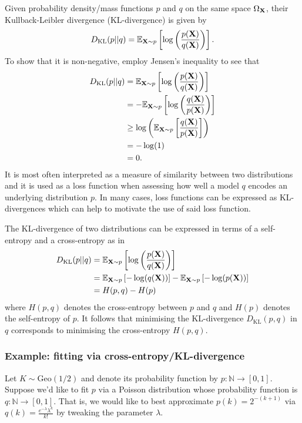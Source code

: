 \documentclass[11pt]{article}
\begin{document}
\begin{appendices}
Given probability density/mass functions $p$ and $q$ on the same space $\Omega_{\mathbf{X}}$, their Kullback-Leibler divergence (KL-divergence) is given by
$$
D_{\text{KL}}(p||q)
=
\mathbb{E}_{\mathbf{X}\sim p}\left[\log\left(\frac{p(\mathbf{X})}{q(\mathbf{X})}\right)\right].
$$
To show that it is non-negative, employ Jensen's inequality to see that
\begin{align*}
    D_{\text{KL}}(p||q)
    &=
    \mathbb{E}_{\mathbf{X}\sim p}\left[\log\left(\frac{p(\mathbf{X})}{q(\mathbf{X})}\right)\right]\\
    &=
    -\mathbb{E}_{\mathbf{X}\sim p}\left[\log\left(\frac{q(\mathbf{X})}{p(\mathbf{X})}\right)\right]\\
    &\geq
    \log\left(\mathbb{E}_{\mathbf{X}\sim p}\left[\frac{q(\mathbf{X})}{p(\mathbf{X})}\right]\right)\\
    &=
    -\log(1)\\
    &=0.
\end{align*}
It is most often interpreted as a measure of similarity between two distributions and it is used as a loss function when assessing how well a model $q$ encodes an underlying distribution $p$. In many cases, loss functions can be expressed as KL-divergences which can help to motivate the use of said loss function.

The KL-divergence of two distributions can be expressed in terms of a self-entropy and a cross-entropy as in
\begin{align*}
    D_{\text{KL}}(p||q)
    &=
    \mathbb{E}_{\mathbf{X}\sim p}\left[\log\left(\frac{p(\mathbf{X})}{q(\mathbf{X})}\right)\right]\\
    &=
    \mathbb{E}_{\mathbf{X}\sim p}\left[-\log(q(\mathbf{X}))\right]-\mathbb{E}_{\mathbf{X}\sim p}\left[-\log(p(\mathbf{X}))\right]\\
    &=
    H(p,q)-H(p)
\end{align*}
where $H(p,q)$ denotes the cross-entropy between $p$ and $q$ and $H(p)$ denotes the self-entropy of $p$. It follows that minimising the KL-divergence $D_{\text{KL}}(p,q)$ in $q$ corresponds to minimising the cross-entropy $H(p,q)$.

\subsubsection*{Example: fitting via cross-entropy/KL-divergence}

Let $K\sim\text{Geo}(1/2)$ and denote its probability function by $p:\mathbb{N}\to[0,1]$. Suppose we'd like to fit $p$ via a Poisson distribution whose probability function is $q:\mathbb{N}\to[0,1]$. That is, we would like to best approximate $p(k)=2^{-(k+1)}$ via $q(k)=\frac{e^{-\lambda}\lambda^k}{k!}$ by tweaking the parameter $\lambda$.


\end{appendices}
\end{document}
